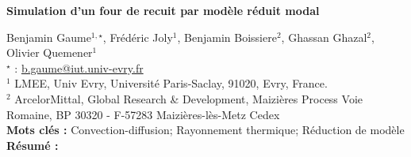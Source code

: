 


    \newpage


%
\begin{flushleft}
\addtocounter{section}{1}
{\Large \textbf{Simulation d'un four de recuit  par modèle réduit modal}}\label{ref:47}
\end{flushleft}
%
Benjamin Gaume$^{1,\star}$, Frédéric Joly$^{1}$, Benjamin Boissiere$^{2}$, Ghassan Ghazal$^{2}$, Olivier Quemener$^{1}$\\[2mm]
$^{\star}$ \Letter : \url{b.gaume@iut.univ-evry.fr}\\[2mm]
{\footnotesize $^{1}$ LMEE, Univ Evry, Université Paris-Saclay, 91020, Evry, France.}\\
{\footnotesize $^{2}$ ArcelorMittal, Global Research \& Development, Maizières Process Voie Romaine, BP 30320 - F-57283 Maizières-lès-Metz Cedex}\\
[4mm]
%
\noindent \textbf{Mots clés : } Convection-diffusion; Rayonnement thermique; Réduction de modèle\\[4mm]
%
\noindent \textbf{Résumé : } 

